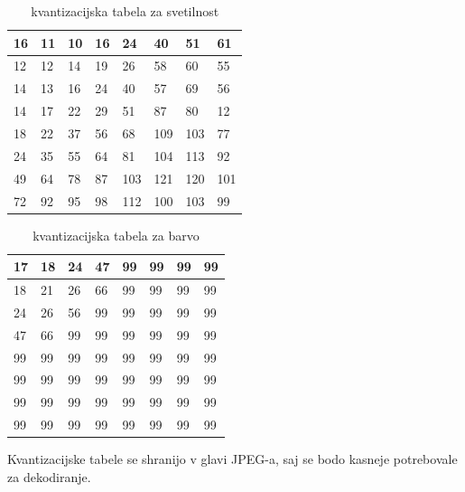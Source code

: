 \documentclass[a4paper,12pt,openright]{book}
\begin{document}
\begin{table}[ht]
\centering
\begin{tabular}{|m{18pt}|m{18pt}|m{18pt}|m{18pt}|m{18pt}|m{18pt}|m{18pt}|m{18pt}|}
\hline
16& 11& 10& 16&  24&  40&  51& 61\\  \hline
12& 12& 14& 19&  26&  58&  60& 55\\  \hline
14& 13& 16& 24&  40&  57&  69& 56\\  \hline
14& 17& 22& 29&  51&  87&  80& 12\\  \hline
18& 22& 37& 56&  68& 109& 103& 77\\  \hline
24& 35& 55& 64&  81& 104& 113& 92\\  \hline
49& 64& 78& 87& 103& 121& 120& 101\\ \hline
72& 92& 95& 98& 112& 100& 103& 99\\  \hline

\end{tabular}
\caption{kvantizacijska tabela za svetilnost}
\label{tab:Kvantizacija_svetilnost}
\end{table}

\begin{table}[ht]
\centering
\begin{tabular}{|m{18pt}|m{18pt}|m{18pt}|m{18pt}|m{18pt}|m{18pt}|m{18pt}|m{18pt}|}
\hline
17& 18& 24& 47& 99& 99& 99& 99 \\ \hline
18& 21& 26& 66& 99& 99& 99& 99 \\ \hline
24& 26& 56& 99& 99& 99& 99& 99 \\ \hline
47& 66& 99& 99& 99& 99& 99& 99 \\ \hline
99& 99& 99& 99& 99& 99& 99& 99 \\ \hline
99& 99& 99& 99& 99& 99& 99& 99 \\ \hline
99& 99& 99& 99& 99& 99& 99& 99 \\ \hline
99& 99& 99& 99& 99& 99& 99& 99 \\ \hline
\end{tabular}
\caption{kvantizacijska tabela za barvo}
\label{tab:Kvantizacija_barva}
\end{table}
Kvantizacijske tabele se shranijo v glavi JPEG-a, saj se bodo kasneje potrebovale za dekodiranje.\par
\end{document}
